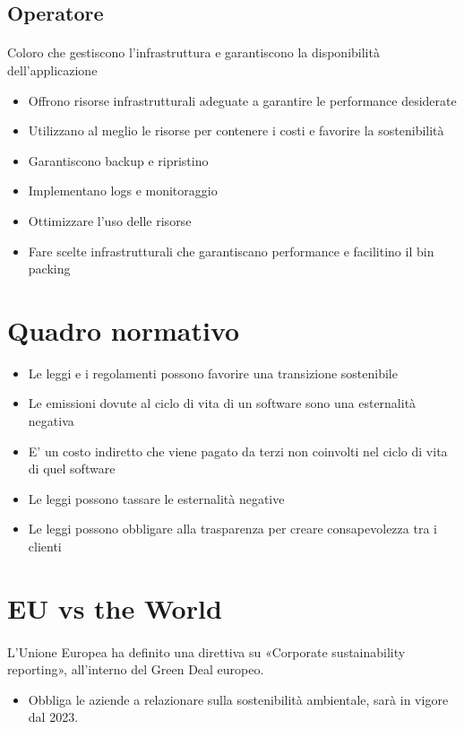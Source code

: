 \documentclass[a4paper, 12pt]{report}
\begin{document}
          \subsection{Operatore}
          \paragraph{}Coloro che gestiscono l’infrastruttura e garantiscono la disponibilità dell’applicazione
          \begin{itemize}
            \item Offrono risorse infrastrutturali adeguate a garantire le performance desiderate
            \item Utilizzano al meglio le risorse per contenere i costi e favorire la sostenibilità
            \item Garantiscono backup e ripristino
            \item Implementano logs e monitoraggio
            \item Ottimizzare l’uso delle risorse
            \item Fare scelte infrastrutturali che garantiscano performance e facilitino il bin packing
          \end{itemize}
          \section{Quadro normativo}
          \begin{itemize}
            \item Le leggi e i regolamenti possono favorire una transizione sostenibile
            \item Le emissioni dovute al ciclo di vita di un software sono una esternalità negativa
            \item E’ un costo indiretto che viene pagato da terzi non coinvolti nel ciclo di vita di quel software
            \item Le leggi possono tassare le esternalità negative 
            \item Le leggi possono obbligare alla trasparenza per creare consapevolezza tra i clienti
          \end{itemize}
          \section{EU vs the World}
          \paragraph{}L’Unione Europea ha definito una direttiva su «Corporate sustainability reporting», all’interno del Green Deal europeo.
          \begin{itemize}
            \item Obbliga le aziende a relazionare sulla sostenibilità ambientale, sarà in vigore dal 2023.
          \end{itemize}
\end{document}
